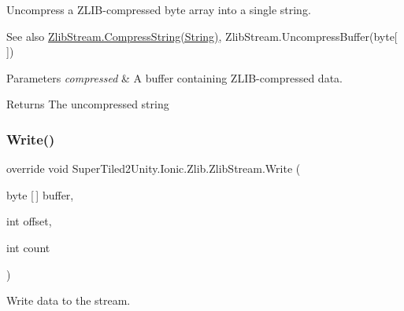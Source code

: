 Uncompress a Z\+L\+I\+B-\/compressed byte array into a single string. 

\begin{DoxySeeAlso}{See also}
\mbox{\hyperlink{class_super_tiled2_unity_1_1_ionic_1_1_zlib_1_1_zlib_stream_a1eacadb410038ea05e574eb2613659ff}{Zlib\+Stream.\+Compress\+String(\+String)}}, Zlib\+Stream.\+Uncompress\+Buffer(byte\mbox{[}$\,$\mbox{]})


\end{DoxySeeAlso}



\begin{DoxyParams}{Parameters}
{\em compressed} & A buffer containing Z\+L\+I\+B-\/compressed data. \\
\hline
\end{DoxyParams}


\begin{DoxyReturn}{Returns}
The uncompressed string
\end{DoxyReturn}
\mbox{\label{class_super_tiled2_unity_1_1_ionic_1_1_zlib_1_1_zlib_stream_a042abef8f9aa0d0043e6081d9de7dea7}} 
\subsubsection{\texorpdfstring{Write()}{Write()}}
{\footnotesize\ttfamily override void Super\+Tiled2\+Unity.\+Ionic.\+Zlib.\+Zlib\+Stream.\+Write (\begin{DoxyParamCaption}\item[{byte \mbox{[}$\,$\mbox{]}}]{buffer,  }\item[{int}]{offset,  }\item[{int}]{count }\end{DoxyParamCaption})}



Write data to the stream. 

